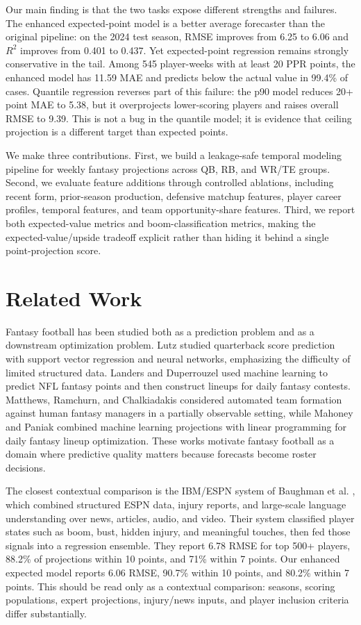 \documentclass{article}
\begin{document}
Our main finding is that the two tasks expose different strengths and failures. The enhanced expected-point model is a better average forecaster than the original pipeline: on the 2024 test season, RMSE improves from 6.25 to 6.06 and $R^2$ improves from 0.401 to 0.437. Yet expected-point regression remains strongly conservative in the tail. Among 545 player-weeks with at least 20 PPR points, the enhanced model has 11.59 MAE and predicts below the actual value in 99.4\% of cases. Quantile regression reverses part of this failure: the p90 model reduces 20+ point MAE to 5.38, but it overprojects lower-scoring players and raises overall RMSE to 9.39. This is not a bug in the quantile model; it is evidence that ceiling projection is a different target than expected points.

We make three contributions. First, we build a leakage-safe temporal modeling pipeline for weekly fantasy projections across QB, RB, and WR/TE groups. Second, we evaluate feature additions through controlled ablations, including recent form, prior-season production, defensive matchup features, player career profiles, temporal features, and team opportunity-share features. Third, we report both expected-value metrics and boom-classification metrics, making the expected-value/upside tradeoff explicit rather than hiding it behind a single point-projection score.

\section{Related Work}
Fantasy football has been studied both as a prediction problem and as a downstream optimization problem. Lutz \citep{lutz2015fantasy} studied quarterback score prediction with support vector regression and neural networks, emphasizing the difficulty of limited structured data. Landers and Duperrouzel \citep{landers2019machine} used machine learning to predict NFL fantasy points and then construct lineups for daily fantasy contests. Matthews, Ramchurn, and Chalkiadakis \citep{matthews2012competing} considered automated team formation against human fantasy managers in a partially observable setting, while Mahoney and Paniak \citep{mahoney2023method} combined machine learning projections with linear programming for daily fantasy lineup optimization. These works motivate fantasy football as a domain where predictive quality matters because forecasts become roster decisions.

The closest contextual comparison is the IBM/ESPN system of Baughman et al. \citep{baughman2021deep}, which combined structured ESPN data, injury reports, and large-scale language understanding over news, articles, audio, and video. Their system classified player states such as boom, bust, hidden injury, and meaningful touches, then fed those signals into a regression ensemble. They report 6.78 RMSE for top 500+ players, 88.2\% of projections within 10 points, and 71\% within 7 points. Our enhanced expected model reports 6.06 RMSE, 90.7\% within 10 points, and 80.2\% within 7 points. This should be read only as a contextual comparison: seasons, scoring populations, expert projections, injury/news inputs, and player inclusion criteria differ substantially.
\end{document}

